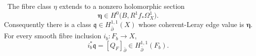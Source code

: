 \begin{lemma}
\label{lem:bcpr-eta-extension}
\Verified\ The fibre class $\eta$ extends to a nonzero holomorphic section
\begin{equation}
 \boldsymbol\eta\in
 H^0\bigl(B,R^1f_*\Omega_X^1\bigr).
\label{eq:bcpr-eta-global-section}
\end{equation}
Consequently there is a class
$\mathfrak q\in H^{1,1}_{\bar\partial}(X)$ whose coherent-Leray edge
value is $\boldsymbol\eta$.  For every smooth fibre inclusion
$i_b\colon F_b\to X$,
\begin{equation}
 i_b^*\mathfrak q=[Q_F]_{\bar\partial}
 \in H^{1,1}_{\bar\partial}(F_b).
\label{eq:bcpr-q-restriction}
\end{equation}
\end{lemma}

